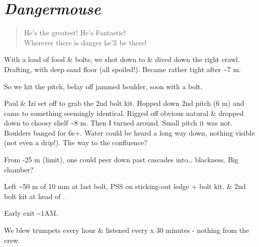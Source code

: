 \section{\texorpdfstring{\emph{Dangermouse}}{Dangermouse}}

\begin{verse}
He's the greatest! He's Fantastic!\\
Wherever there is danger he'll be there!
\end{verse}



With a load of food \& bolts, we shot down to  \& dived
down the right crawl. Drafting, with deep sand floor (all spoiled!).
Became rather tight after \textasciitilde7 m.

So we hit the pitch, belay off jammed boulder, soon with a bolt.

Paul \& Izi set off to grab the 2nd bolt kit. Hopped down 2nd pitch (6
m) and came to something seemingly identical. Rigged off obvious natural
\& dropped down to choosy shelf \textasciitilde8 m. Then I turned
around. Small pitch it was not. Boulders banged for 6s+. Water could be
heard a long way down, nothing visible (not even a drip!). The way
to the  confluence?

From -25 m (limit), one could peer down past cascades into\ldots{}
blackness. Big chamber?

Left \textasciitilde50 m of 10 mm at last bolt, PSS on sticking-out
ledge + bolt kit. \& 2nd bolt kit at head of .

Early exit \textasciitilde1AM.

We blew trumpets every hour \& listened every x 30 minutes - nothing
from the  crew.


